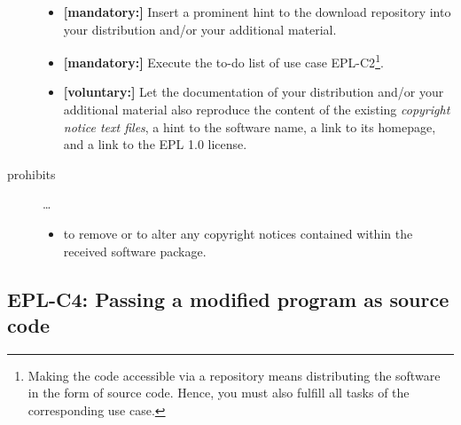 \begin{description}
\begin{itemize}
  \item \textbf{[mandatory:]} Insert a prominent hint to the download repository
  into your distribution and/or your additional material.
  
  \item \textbf{[mandatory:]} Execute the to-do list of use case EPL-C2\footnote{
  Making the code accessible via a repository means distributing the software in
  the form of source code. Hence, you must also fulfill all tasks of the
  corresponding use case.}.
  
  \item \textbf{[voluntary:]} Let the documentation of your distribution and/or
  your additional material also reproduce the content of the existing
  \emph{copyright notice text files}, a hint to the software name, a link to its
  homepage, and a link to the EPL 1.0 license.
    
\end{itemize}

\item[prohibits] \ldots
\begin{itemize}
  \item to remove or to alter any copyright notices contained within the
  received software package.
\end{itemize}

\end{description}

\subsection{EPL-C4: Passing a modified program as source code}
\label{OSUC-04S-EPL} 

